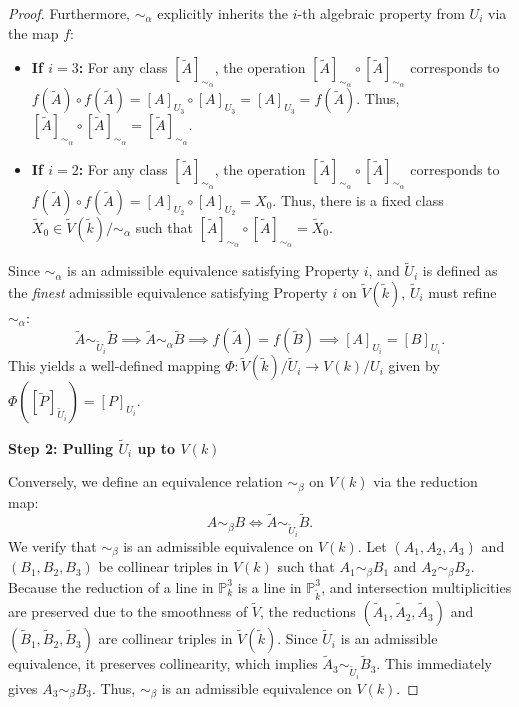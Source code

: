 \documentclass[11pt]{article}
\theoremstyle{definition}
\begin{document}
\begin{proof}
Furthermore, $\sim_\alpha$ explicitly inherits the $i$-th algebraic property from $U_i$ via the map $f$:
\begin{itemize}
    \item \textbf{If $i = 3$:} For any class $[\tilde{A}]_{\sim_\alpha}$, the operation $[\tilde{A}]_{\sim_\alpha} \circ [\tilde{A}]_{\sim_\alpha}$ corresponds to $f(\tilde{A}) \circ f(\tilde{A}) = [A]_{U_3} \circ [A]_{U_3} = [A]_{U_3} = f(\tilde{A})$. Thus, $[\tilde{A}]_{\sim_\alpha} \circ [\tilde{A}]_{\sim_\alpha} = [\tilde{A}]_{\sim_\alpha}$.
    \item \textbf{If $i = 2$:} For any class $[\tilde{A}]_{\sim_\alpha}$, the operation $[\tilde{A}]_{\sim_\alpha} \circ [\tilde{A}]_{\sim_\alpha}$ corresponds to $f(\tilde{A}) \circ f(\tilde{A}) = [A]_{U_2} \circ [A]_{U_2} = X_0$. Thus, there is a fixed class $\tilde{X}_0 \in \tilde{V}(\tilde{k})/\sim_\alpha$ such that $[\tilde{A}]_{\sim_\alpha} \circ [\tilde{A}]_{\sim_\alpha} = \tilde{X}_0$.
\end{itemize}
Since $\sim_\alpha$ is an admissible equivalence satisfying Property $i$, and $\tilde{U}_i$ is defined as the \emph{finest} admissible equivalence satisfying Property $i$ on $\tilde{V}(\tilde{k})$, $\tilde{U}_i$ must refine $\sim_\alpha$:
\[ \tilde{A} \sim_{\tilde{U}_i} \tilde{B} \implies \tilde{A} \sim_\alpha \tilde{B} \implies f(\tilde{A}) = f(\tilde{B}) \implies [A]_{U_i} = [B]_{U_i}. \]
This yields a well-defined mapping $\Phi: \tilde{V}(\tilde{k})/\tilde{U}_i \to V(k)/U_i$ given by $\Phi([\tilde{P}]_{\tilde{U}_i}) = [P]_{U_i}$.

\vspace{0.5em}
\noindent\textbf{Step 2: Pulling $\tilde{U}_i$ up to $V(k)$}

Conversely, we define an equivalence relation $\sim_\beta$ on $V(k)$ via the reduction map:
\[ A \sim_\beta B \iff \tilde{A} \sim_{\tilde{U}_i} \tilde{B}. \]
We verify that $\sim_\beta$ is an admissible equivalence on $V(k)$. Let $(A_1, A_2, A_3)$ and $(B_1, B_2, B_3)$ be collinear triples in $V(k)$ such that $A_1 \sim_\beta B_1$ and $A_2 \sim_\beta B_2$. Because the reduction of a line in $\mathbb{P}^3_k$ is a line in $\mathbb{P}^3_{\tilde{k}}$, and intersection multiplicities are preserved due to the smoothness of $\tilde{V}$, the reductions $(\tilde{A}_1, \tilde{A}_2, \tilde{A}_3)$ and $(\tilde{B}_1, \tilde{B}_2, \tilde{B}_3)$ are collinear triples in $\tilde{V}(\tilde{k})$. 
Since $\tilde{U}_i$ is an admissible equivalence, it preserves collinearity, which implies $\tilde{A}_3 \sim_{\tilde{U}_i} \tilde{B}_3$. 
This immediately gives $A_3 \sim_\beta B_3$. Thus, $\sim_\beta$ is an admissible equivalence on $V(k)$.


\end{proof}
\end{document}
